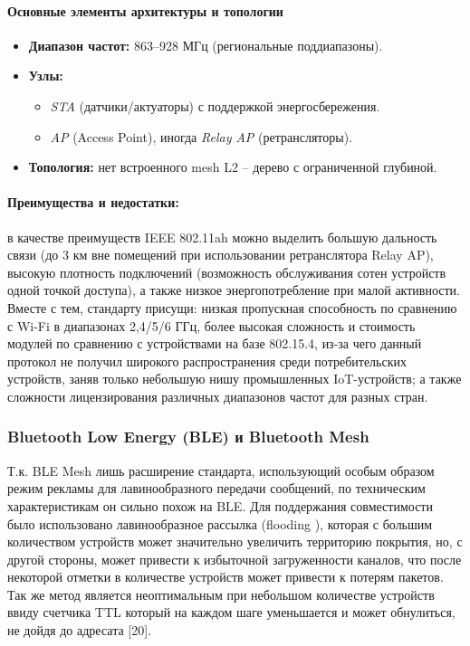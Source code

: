 \documentclass[a4paper,12pt]{article}
\begin{document}
\paragraph{Основные элементы архитектуры и топологии}
\begin{itemize}
  \item \textbf{Диапазон частот:} 863–928 МГц (региональные поддиапазоны).
  \item \textbf{Узлы:} 
    \begin{itemize}
      \item \emph{STA} (датчики/актуаторы) с поддержкой энергосбережения.
      \item \emph{AP} (Access Point), иногда \emph{Relay AP} (ретрансляторы).
    \end{itemize}
  \item \textbf{Топология:} нет встроенного mesh L2 -- дерево с ограниченной глубиной.
\end{itemize}

\paragraph{Преимущества и недостатки:}

в качестве преимуществ IEEE 802.11ah можно выделить большую дальность связи (до 3 км вне помещений при использовании ретранслятора Relay AP), высокую плотность подключений (возможность обслуживания сотен устройств одной точкой доступа), а также низкое энергопотребление при малой активности. Вместе с тем, стандарту присущи: низкая пропускная способность по сравнению с Wi-Fi в диапазонах 2,4/5/6 ГГц, более высокая сложность и стоимость модулей по сравнению с устройствами на базе 802.15.4, из-за чего данный протокол не получил широкого распространения среди потребительских устройств, заняв только небольшую нишу промышленных IoT-устройств; а также сложности лицензирования различных диапазонов частот для разных стран.



\subsubsection{Bluetooth Low Energy (BLE) и Bluetooth Mesh}
Т.к. BLE Mesh лишь расширение стандарта, использующий особым образом режим рекламы для лавинообразного передачи сообщений, по техническим характеристикам он сильно похож на BLE. Для поддержания совместимости было использовано лавинообразное рассылка (flooding \cite{BLE_mesh_spec}), которая с большим количеством устройств может значительно увеличить территорию покрытия, но, с другой стороны, может привести к избыточной загруженности каналов, что после некоторой отметки в количестве устройств может привести к потерям пакетов. Так же метод является неоптимальным при небольшом количестве устройств ввиду счетчика TTL который на каждом шаге уменьшается и может обнулиться, не дойдя до адресата [20].
\end{document}
